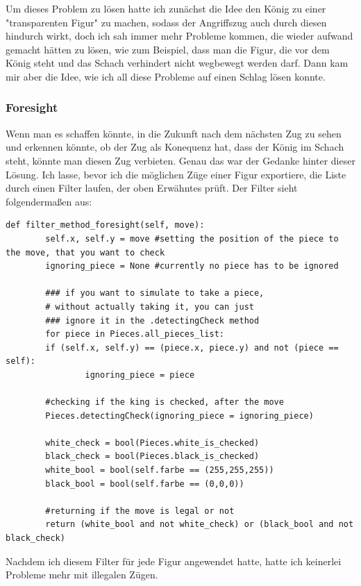 \documentclass[a4paper, 10pt]{scrartcl}
\begin{document}
Um dieses Problem zu lösen hatte ich zunächst die Idee den König zu einer "transparenten
Figur" zu machen, sodass der Angriffszug auch durch diesen hindurch wirkt, doch ich sah immer
mehr Probleme kommen, die wieder aufwand gemacht hätten zu lösen, wie zum Beispiel, dass man die 
Figur, die vor dem König steht und das Schach verhindert nicht wegbewegt werden darf. Dann kam mir
aber die Idee, wie ich all diese Probleme auf einen Schlag lösen konnte.

\subsubsection{Foresight}
Wenn man es schaffen könnte, in die Zukunft nach dem nächsten Zug zu sehen und erkennen könnte, ob
der Zug als Konequenz hat, dass der König im Schach steht, könnte man diesen Zug verbieten. 
Genau das war der Gedanke hinter dieser Lösung. Ich lasse, bevor ich die möglichen Züge
einer Figur exportiere, die Liste durch einen Filter laufen, der oben Erwähntes prüft.
Der Filter sieht folgendermaßen aus:

\begin{lstlisting}
def filter_method_foresight(self, move):
        self.x, self.y = move #setting the position of the piece to the move, that you want to check
        ignoring_piece = None #currently no piece has to be ignored

        ### if you want to simulate to take a piece, 
        # without actually taking it, you can just 
        ### ignore it in the .detectingCheck method 
        for piece in Pieces.all_pieces_list:
        if (self.x, self.y) == (piece.x, piece.y) and not (piece == self):
                ignoring_piece = piece

        #checking if the king is checked, after the move
        Pieces.detectingCheck(ignoring_piece = ignoring_piece)

        white_check = bool(Pieces.white_is_checked)
        black_check = bool(Pieces.black_is_checked)
        white_bool = bool(self.farbe == (255,255,255))
        black_bool = bool(self.farbe == (0,0,0))

        #returning if the move is legal or not
        return (white_bool and not white_check) or (black_bool and not black_check)
\end{lstlisting}

Nachdem ich diesem Filter für jede Figur angewendet hatte, hatte ich keinerlei Probleme mehr mit
illegalen Zügen. 
\end{document}

